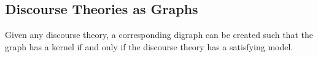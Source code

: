 \subsection{Discourse Theories as Graphs}
\label{sub:Discourse Theories as Graphs}
Given any discourse theory, a corresponding digraph can be created such that the graph has a kernel if and only if the discourse theory has a satisfying model.
